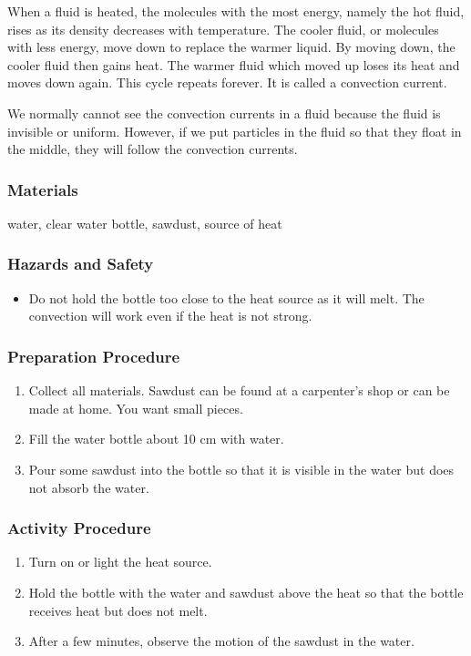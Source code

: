 When a fluid is heated, the molecules with the most energy, namely the hot fluid, rises as its density decreases with temperature.  The cooler fluid, or molecules with less energy, move down to replace the warmer liquid.  By moving down, the cooler fluid then gains heat.  The warmer fluid which moved up loses its heat and moves down again.  This cycle repeats forever.  It is called a convection current.

We normally cannot see the convection currents in a fluid because the fluid is invisible or uniform.  However, if we put particles in the fluid so that they float in the middle, they will follow the convection currents.

\subsubsection*{Materials}
water, clear water bottle, sawdust, source of heat

\subsubsection*{Hazards and Safety}
\begin{itemize}
\item{Do not hold the bottle too close to the heat source as it will melt.  The convection will work even if the heat is not strong.}
\end{itemize}

\subsubsection*{Preparation Procedure}
\begin{enumerate}
\item{Collect all materials.  Sawdust can be found at a carpenter's shop or can be made at home.  You want small pieces.}
\item{Fill the water bottle about 10 cm with water.}
\item{Pour some sawdust into the bottle so that it is visible in the water but does not absorb the water.}
\end{enumerate}

\subsubsection*{Activity Procedure}
\begin{enumerate}
\item{Turn on or light the heat source.}
\item{Hold the bottle with the water and sawdust above the heat so that the bottle receives heat but does not melt.}
\item{After a few minutes, observe the motion of the sawdust in the water.}
\end{enumerate}

